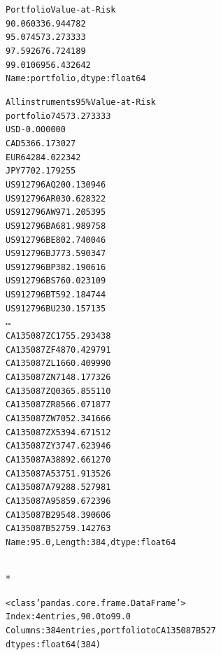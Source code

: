 \documentclass[letterpaper,10pt,english]{/anaconda/lib/python2.7/site-packages/sphinx/texinputs/sphinxhowto}
\def\smaller{\fontsize{9.5pt}{9.5pt}\selectfont}
\newenvironment{InvisibleVerbatim}
        {\begin{mdframed}[leftmargin=0.1\linewidth,innerleftmargin=3pt,innerrightmargin=3pt, userdefinedwidth=1\linewidth, linewidth=0pt, linecolor=white, usetwoside=false]}
        {\end{mdframed}}
\begin{document}
    

        
        

            
                \begin{InvisibleVerbatim}
                \vspace{-0.5\baselineskip}
\begin{alltt}Portfolio Value-at-Risk
90.0     60336.944782
95.0     74573.273333
97.5     92676.724189
99.0    106956.432642
Name: portfolio, dtype: float64

All instruments 95\% Value-at-Risk
portfolio       74573.273333
USD                -0.000000
CAD              5366.173027
EUR             64284.022342
JPY              7702.179255
US912796AQ20        0.130946
US912796AR03        0.628322
US912796AW97        1.205395
US912796BA68        1.989758
US912796BE80        2.740046
US912796BJ77        3.590347
US912796BP38        2.190616
US912796BS76        0.023109
US912796BT59        2.184744
US912796BU23        0.157135
\ldots
CA135087ZC17    55.293438
CA135087ZF48    70.429791
CA135087ZL16    60.409990
CA135087ZN71    48.177326
CA135087ZQ03    65.855110
CA135087ZR85    66.071877
CA135087ZW70    52.341666
CA135087ZX53    94.671512
CA135087ZY37    47.623946
CA135087A388    92.661270
CA135087A537    51.913526
CA135087A792    88.527981
CA135087A958    59.672396
CA135087B295    48.390606
CA135087B527    59.142763
Name: 95.0, Length: 384, dtype: float64
\end{alltt}

            \end{InvisibleVerbatim}
            
                \makebox[0.1\linewidth]{\smaller\hfill\tt\color{nbframe-out-prompt}Out\hspace{4pt}{[}32{]}:\hspace{4pt}}\\*
                \vspace{-2.55\baselineskip}\begin{InvisibleVerbatim}
                \vspace{-0.5\baselineskip}
\begin{alltt}<class 'pandas.core.frame.DataFrame'>
Index: 4 entries, 90.0 to 99.0
Columns: 384 entries, portfolio to CA135087B527
dtypes: float64(384)\end{alltt}

            \end{InvisibleVerbatim}
            
\end{document}
